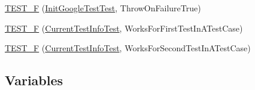 \begin{DoxyCompactItemize}
\item 
\hyperlink{namespacetesting_ad7513c23ff21a4d2761cadfd2afe87e1}{T\+E\+S\+T\+\_\+F} (\hyperlink{classtesting_1_1InitGoogleTestTest}{Init\+Google\+Test\+Test}, Throw\+On\+Failure\+True)
\item 
\hyperlink{namespacetesting_a1e55a3ca18d877e1e83ce0ed9e7b5c79}{T\+E\+S\+T\+\_\+F} (\hyperlink{classtesting_1_1CurrentTestInfoTest}{Current\+Test\+Info\+Test}, Works\+For\+First\+Test\+In\+A\+Test\+Case)
\item 
\hyperlink{namespacetesting_a3775bdbb5d24619425c52103e7ae6434}{T\+E\+S\+T\+\_\+F} (\hyperlink{classtesting_1_1CurrentTestInfoTest}{Current\+Test\+Info\+Test}, Works\+For\+Second\+Test\+In\+A\+Test\+Case)
\end{DoxyCompactItemize}
\subsection*{Variables}
